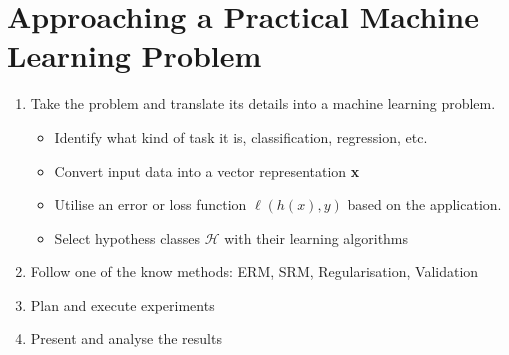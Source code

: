 \section{Approaching a Practical Machine Learning Problem}

\begin{enumerate}
    \item Take the problem and translate its details into a machine learning problem.
    \begin{itemize}
        \item Identify what kind of task it is, classification, regression, etc.
        \item Convert input data into a vector representation \textbf{x}
        \item Utilise an error or loss function $\ell(h(x),y)$ based on the application.
        \item Select hypothess classes $\mathcal{H}$ with their learning algorithms
    \end{itemize}
    \item Follow one of the know methods: ERM, SRM, Regularisation, Validation
    \item Plan and execute experiments
    \item Present and analyse the results
\end{enumerate}
